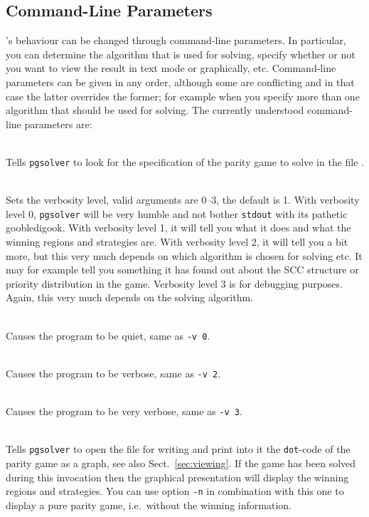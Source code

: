 \subsection{Command-Line Parameters}
\pgsolver's behaviour can be changed through command-line parameters. In particular, you can determine
the algorithm that is used for solving, specify whether or not you want to view the result in text
mode or graphically, etc. Command-line parameters can be given in any order, although some are
conflicting and in that case the latter overrides the former; for example when you specify more than
one algorithm that should be used for solving. The currently understood command-line parameters are:
\begin{description}
\itemsep3mm
\item[\nonterminal{filename}] \ \\
   Tells \texttt{pgsolver} to look for the specification of the parity game to solve in the file
   .

\item[{\ttfamily  -v \nonterminal{level}}] \ \\
   Sets the verbosity level, valid arguments are $0$--$3$, the default is 1. With verbosity level $0$,
   \texttt{pgsolver} will be very humble and not bother \texttt{stdout} with its pathetic goobledigook.
   With verbosity level 1, it will tell you what it does and what the winning regions and strategies
   are. With verbosity level 2, it will tell you a bit more, but this very much depends on which
   algorithm is chosen for solving etc. It may for example tell you something it has found out about the
   SCC structure or priority distribution in the game. Verbosity level 3 is for debugging purposes. Again,
   this very much depends on the solving algorithm.

\item[{\ttfamily --quiet}] \ \\
   Causes the program to be quiet, same as \texttt{-v 0}.

\item[{\ttfamily --verbose}] \ \\
   Causes the program to be verbose, same as \texttt{-v 2}.

\item[{\ttfamily --debug}] \ \\
   Causes the program to be very verbose, same as \texttt{-v 3}.

\item[{\ttfamily -d \nonterminal{filename}}] \ \\
   Tells \texttt{pgsolver} to open the file  for writing and print into it the
   \texttt{dot}-code of the parity game as a graph, see also Sect.~\ref{sec:viewing}. If the game has
   been solved during this invocation then the graphical presentation will display the winning regions
   and strategies. You can use option \texttt{-n} in combination with this one to display a pure parity
   game, i.e.\ without the winning information.


\end{description}
